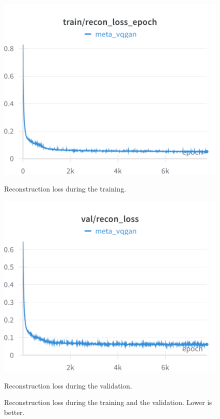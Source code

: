 
\begin{figure}[H]
\includegraphics[width=\linewidth]{detailed_engineering/Meta VQGAN/charts/Section-2-Panel-13-1qhe42yar.png}
\caption{Reconstruction loss during the training.}
\endminipage\hfill
{}
\includegraphics[width=\linewidth]{detailed_engineering/Meta VQGAN/charts/Section-4-Panel-3-hkj1c12xb.png}
\caption{Reconstruction loss during the validation.}
\endminipage
\caption{Reconstruction loss during the training and the validation. Lower is better.}
\end{figure}

